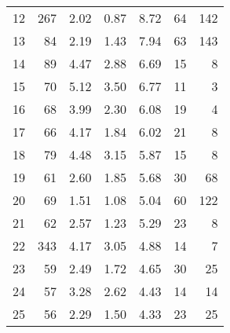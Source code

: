 \begin{tabular}{rrrrrrr}
12 &      267 &                             2.02 &                             0.87 &                             8.72 &              64 &             142 \\
13 &       84 &                             2.19 &                             1.43 &                             7.94 &              63 &             143 \\
14 &       89 &                             4.47 &                             2.88 &                             6.69 &              15 &               8 \\
15 &       70 &                             5.12 &                             3.50 &                             6.77 &              11 &               3 \\
16 &       68 &                             3.99 &                             2.30 &                             6.08 &              19 &               4 \\
17 &       66 &                             4.17 &                             1.84 &                             6.02 &              21 &               8 \\
18 &       79 &                             4.48 &                             3.15 &                             5.87 &              15 &               8 \\
19 &       61 &                             2.60 &                             1.85 &                             5.68 &              30 &              68 \\
20 &       69 &                             1.51 &                             1.08 &                             5.04 &              60 &             122 \\
21 &       62 &                             2.57 &                             1.23 &                             5.29 &              23 &               8 \\
22 &      343 &                             4.17 &                             3.05 &                             4.88 &              14 &               7 \\
23 &       59 &                             2.49 &                             1.72 &                             4.65 &              30 &              25 \\
24 &       57 &                             3.28 &                             2.62 &                             4.43 &              14 &              14 \\
25 &       56 &                             2.29 &                             1.50 &                             4.33 &              23 &              25 \\

\end{tabular}
